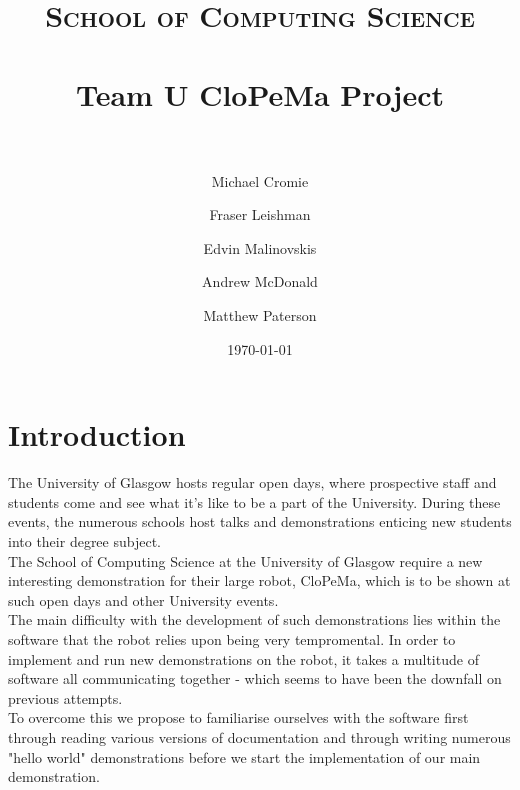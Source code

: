 \documentclass[paper=a4, fontsize=11pt]{scrartcl}
\title{
		\usefont{OT1}{bch}{b}{n}
		\normalfont \normalsize \textsc{School of Computing Science} \\ [25pt]
		\horrule{0.5pt} \\[0.4cm]
		\huge Team U CloPeMa Project \\
		\horrule{2pt} \\[0.5cm]
		}
\author{
	\usefont{OT1}{bch}{b}{n}
    	\normalfont Michael Cromie\\
    	\and
    	Fraser Leishman\\
    	\and
    	Edvin Malinovskis\\
    	\and
    	Andrew McDonald\\
    	\and
    	Matthew Paterson
	}
\date{
		\usefont{OT1}{bch}{b}{n}
		\normalfont \normalsize \today
        }
\numberwithin{equation}{section}		%
\numberwithin{figure}{section}			%
\numberwithin{table}{section}				%
\begin{document}
\maketitle


\abstract {}



\section{Introduction}

The University of Glasgow hosts regular open days, where prospective staff and students come and see what it's like to be a part of the University. During these events, the numerous schools host talks and demonstrations enticing new students into their degree subject.\\
The School of Computing Science at the University of Glasgow require a new interesting demonstration for their large robot, CloPeMa, which is to be shown at such open days and other University events.\\
The main difficulty with the development of such demonstrations lies within the software that the robot relies upon being very tempromental. In order to implement and run new demonstrations on the robot, it takes a multitude of software all communicating together - which seems to have been the downfall on previous attempts.\\
To overcome this we propose to familiarise ourselves with the software first through reading various versions of documentation and through writing numerous "hello world" demonstrations before we start the implementation of our main demonstration.\\









\end{document}

